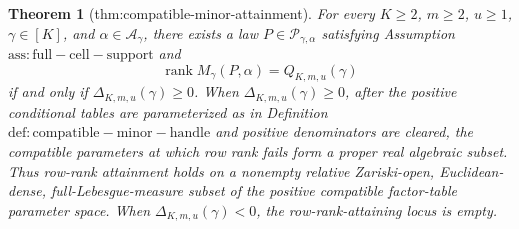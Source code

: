 \documentclass{article}
\newtheorem{theorem}{Theorem}
\begin{document}
\begin{theorem}[thm:compatible-minor-attainment]\label{thm:compatible-minor-attainment}
For every \(K\ge2\), \(m\ge2\), \(u\ge1\), \(\gamma\in[K]\), and \(\alpha\in\mathcal A_\gamma\), there exists a law \(P\in\mathcal P_{\gamma,\alpha}\) satisfying Assumption \(\mathrm{ass:full-cell-support}\) and \[\operatorname{rank}M_\gamma(P,\alpha)=Q_{K,m,u}(\gamma)\] if and only if \(\Delta_{K,m,u}(\gamma)\ge0\). When \(\Delta_{K,m,u}(\gamma)\ge0\), after the positive conditional tables are parameterized as in Definition \(\mathrm{def:compatible-minor-handle}\) and positive denominators are cleared, the compatible parameters at which row rank fails form a proper real algebraic subset. Thus row-rank attainment holds on a nonempty relative Zariski-open, Euclidean-dense, full-Lebesgue-measure subset of the positive compatible factor-table parameter space. When \(\Delta_{K,m,u}(\gamma)<0\), the row-rank-attaining locus is empty.
\end{theorem}
\end{document}
